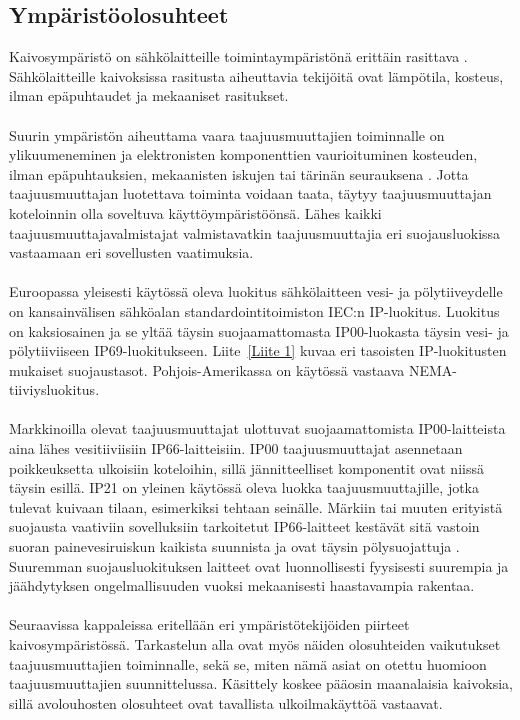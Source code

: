 \documentclass[finnish,12pt,a4paper,pdftex,elec,utf8]{aaltothesis}
\begin{document}
\subsection{Ympäristöolosuhteet}
Kaivosympäristö on sähkölaitteille toimintaympäristönä erittäin rasittava \cite[s. 251]{Hakapää}. Sähkölaitteille kaivoksissa rasitusta aiheuttavia tekijöitä ovat lämpötila, kosteus, ilman epäpuhtaudet ja mekaaniset rasitukset.
\\\\
Suurin ympäristön aiheuttama vaara taajuusmuuttajien toiminnalle on ylikuumeneminen ja elektronisten komponenttien vaurioituminen kosteuden, ilman  epäpuhtauksien, mekaanisten iskujen tai tärinän seurauksena \cite[s. 251]{Hakapää}. Jotta taajuusmuuttajan luotettava toiminta voidaan taata, täytyy taajuusmuuttajan koteloinnin olla soveltuva käyttöympäristöönsä. Lähes kaikki taajuusmuuttajavalmistajat valmistavatkin taajuusmuuttajia eri suojausluokissa vastaamaan eri sovellusten vaatimuksia.
\\\\
Euroopassa yleisesti käytössä oleva luokitus sähkölaitteen vesi- ja pölytiiveydelle on kansainvälisen sähköalan standardointitoimiston IEC:n IP-luokitus. Luokitus on kaksiosainen ja se yltää täysin suojaamattomasta IP00-luokasta täysin vesi- ja pölytiiviiseen IP69-luokitukseen. \cite{IP} Liite~\ref{Liite 1} kuvaa eri tasoisten IP-luokitusten mukaiset suojaustasot. Pohjois-Amerikassa on käytössä vastaava NEMA-tiiviysluokitus.
\\\\
Markkinoilla olevat taajuusmuuttajat ulottuvat suojaamattomista IP00-laitteista aina lähes vesitiiviisiin IP66-laitteisiin. IP00 taajuusmuuttajat asennetaan poikkeuksetta ulkoisiin koteloihin, sillä jännitteelliset komponentit ovat niissä täysin esillä. IP21 on yleinen käytössä oleva luokka taajuusmuuttajille, jotka tulevat kuivaan tilaan, esimerkiksi tehtaan seinälle. Märkiin tai muuten erityistä suojausta vaativiin sovelluksiin tarkoitetut IP66-laitteet kestävät sitä vastoin suoran painevesiruiskun kaikista suunnista ja ovat täysin pölysuojattuja \cite{IP}. Suuremman suojausluokituksen laitteet ovat luonnollisesti fyysisesti suurempia ja jäähdytyksen ongelmallisuuden vuoksi mekaanisesti haastavampia rakentaa.
\\\\
Seuraavissa kappaleissa eritellään eri ympäristötekijöiden piirteet kaivosympäristössä. Tarkastelun alla ovat myös näiden olosuhteiden vaikutukset taajuusmuuttajien toiminnalle, sekä se, miten nämä asiat on otettu huomioon taajuusmuuttajien suunnittelussa. Käsittely koskee pääosin maanalaisia kaivoksia, sillä avolouhosten olosuhteet ovat tavallista ulkoilmakäyttöä vastaavat.
\end{document}
